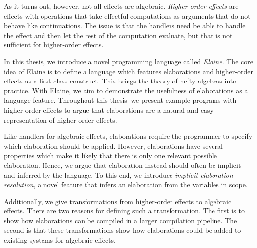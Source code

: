 
As it turns out, however, not all effects are algebraic. \emph{Higher-order effects} are effects with operations that take effectful computations as arguments that do not behave like continuations. The issue is that the handlers need be able to handle the effect and then let the rest of the computation evaluate, but that is not sufficient for higher-order effects.


In this thesis, we introduce a novel programming language called \emph{Elaine}. The core idea of Elaine is to define a language which features elaborations and higher-order effects as a first-class construct. This brings the theory of hefty algebras into practice. With Elaine, we aim to demonstrate the usefulness of elaborations as a language feature. Throughout this thesis, we present example programs with higher-order effects to argue that elaborations are a natural and easy representation of higher-order effects.

Like handlers for algebraic effects, elaborations require the programmer to specify which elaboration should be applied. However, elaborations have several properties which make it likely that there is only one relevant possible elaboration. Hence, we argue that elaboration instead should often be implicit and inferred by the language. To this end, we introduce \emph{implicit elaboration resolution}, a novel feature that infers an elaboration from the variables in scope.

Additionally, we give transformations from higher-order effects to algebraic effects. There are two reasons for defining such a transformation. The first is to show how elaborations can be compiled in a larger compilation pipeline. The second is that these transformations show how elaborations could be added to existing systems for algebraic effects.

